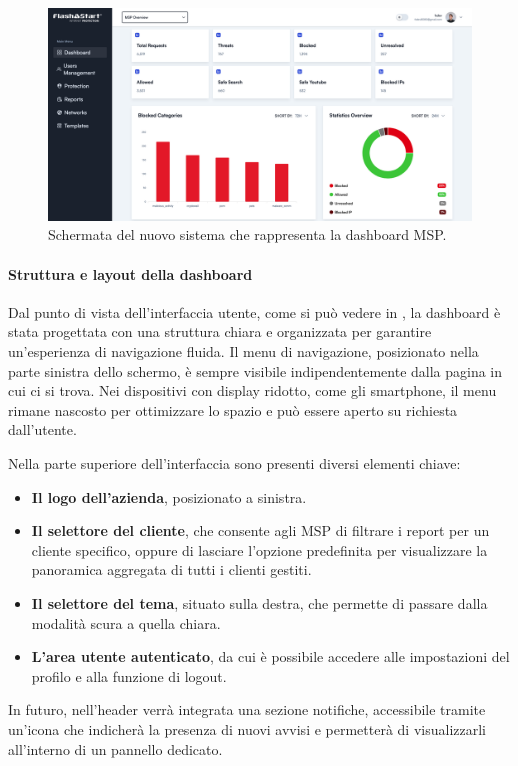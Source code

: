 \begin{figure}
  \centering
  \includegraphics[width=1\textwidth]{figures/new-dashboard.png}
  \caption{Schermata del nuovo sistema che rappresenta la dashboard MSP.}
  \label{fig:dashboard-msp}
\end{figure}

\paragraph{Struttura e layout della dashboard}
Dal punto di vista dell’interfaccia utente, come si può vedere in , la dashboard è stata progettata con una struttura chiara e organizzata per garantire un’esperienza di navigazione fluida. Il menu di navigazione, posizionato nella parte sinistra dello schermo, è sempre visibile indipendentemente dalla pagina in cui ci si trova. Nei dispositivi con display ridotto, come gli smartphone, il menu rimane nascosto per ottimizzare lo spazio e può essere aperto su richiesta dall’utente.

Nella parte superiore dell’interfaccia sono presenti diversi elementi chiave:
\begin{itemize}
  \item \textbf{Il logo dell'azienda}, posizionato a sinistra.
  \item \textbf{Il selettore del cliente}, che consente agli MSP di filtrare i report per un cliente specifico, oppure di lasciare l’opzione predefinita per visualizzare la panoramica aggregata di tutti i clienti gestiti.
  \item \textbf{Il selettore del tema}, situato sulla destra, che permette di passare dalla modalità scura a quella chiara.
  \item \textbf{L’area utente autenticato}, da cui è possibile accedere alle impostazioni del profilo e alla funzione di logout.
\end{itemize}
%
In futuro, nell’header verrà integrata una sezione notifiche, accessibile tramite un’icona che indicherà la presenza di nuovi avvisi e permetterà di visualizzarli all’interno di un pannello dedicato.

